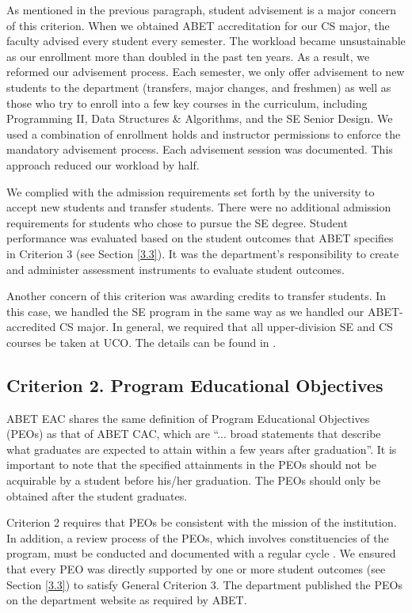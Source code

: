 \documentclass{article}
\begin{document}
As mentioned in the previous paragraph, student advisement is a major concern of this criterion. When we obtained ABET accreditation for our CS major, the faculty advised every student every semester.  The workload became unsustainable as our enrollment more than doubled in the past ten years.  As a result, we reformed our advisement process.  Each semester, we only offer advisement to new students to the department (transfers, major changes, and freshmen) as well as those who try to enroll into a few key courses in the curriculum, including Programming II, Data Structures \& Algorithms, and the SE Senior Design.  We used a combination of enrollment holds and instructor permissions to enforce the mandatory advisement process.  Each advisement session was documented.  This approach reduced our workload by half.   

We complied with the admission requirements set forth by the university to accept new students and transfer students. There were no additional admission requirements for students who chose to pursue the SE degree. Student performance was evaluated based on the student outcomes that ABET specifies in Criterion 3 (see Section \ref{3.3}). It was the department’s responsibility to create and administer assessment instruments to evaluate student outcomes.

Another concern of this criterion was awarding credits to transfer students.  In this case, we handled the SE program in the same way as we handled our ABET-accredited CS major.  In general, we required that all upper-division SE and CS courses be taken at UCO.  The details can be found in \cite{fu14}. 

\subsection{Criterion 2. Program Educational Objectives} \label{peo}
ABET EAC shares the same definition of Program Educational Objectives (PEOs) as that of ABET CAC, which are ``... broad statements that describe what graduates are expected to attain within a few years after graduation''.  It is important to note that the specified attainments in the PEOs should not be acquirable by a student before his/her graduation.  The PEOs should only be obtained after the student graduates.  

Criterion 2 requires that PEOs be consistent with the mission of the institution.  In addition, a review process of the PEOs, which involves constituencies of the program, must be conducted and documented with a regular cycle \cite{fu14}.  We ensured that every PEO was directly supported by one or more student outcomes (see Section \ref{3.3}) to satisfy General Criterion 3.  The department published the PEOs on the department website as required by ABET.
\end{document}
